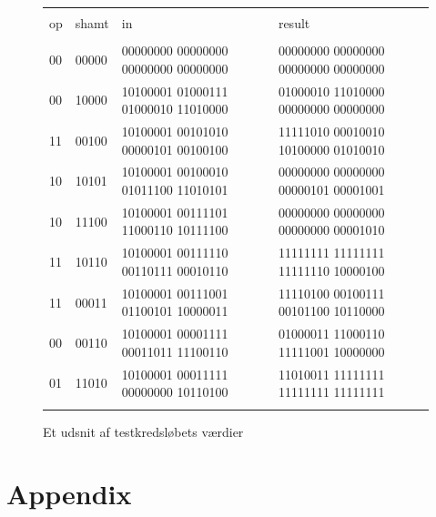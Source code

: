\documentclass[10pt,a4paper,danish]{article}
\begin{document}
\begin{figure}[htb]
\begin{tabular}{l l l | l}
  \hline\\
  op & shamt & in & result\\
  \hline\\
  00 & 00000 & 00000000 00000000 00000000 00000000 & 00000000 00000000 00000000 00000000\\
  00 & 10000 & 10100001 01000111 01000010 11010000 & 01000010 11010000 00000000 00000000\\
  11 & 00100 & 10100001 00101010 00000101 00100100 & 11111010 00010010 10100000 01010010\\
  10 & 10101 & 10100001 00100010 01011100 11010101 & 00000000 00000000 00000101 00001001\\
  10 & 11100 & 10100001 00111101 11000110 10111100 & 00000000 00000000 00000000 00001010\\
  11 & 10110 & 10100001 00111110 00110111 00010110 & 11111111 11111111 11111110 10000100\\
  11 & 00011 & 10100001 00111001 01100101 10000011 & 11110100 00100111 00101100 10110000\\
  00 & 00110 & 10100001 00001111 00011011 11100110 & 01000011 11000110 11111001 10000000\\
  01 & 11010 & 10100001 00011111 00000000 10110100 & 11010011 11111111 11111111 11111111\\
  \hline\\
\end{tabular}
\caption{Et udsnit af testkredsløbets værdier}
\label{fig:shiftertest}
\end{figure}

\section{Appendix}
\end{document}
